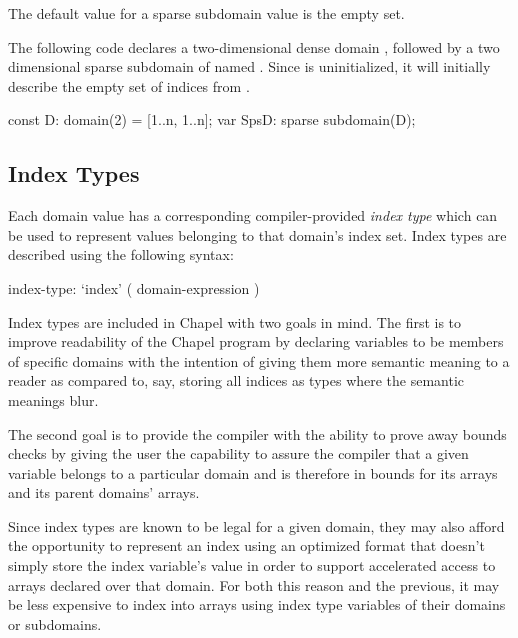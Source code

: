The default value for a sparse subdomain value is the empty set.

\begin{example}
The following code declares a two-dimensional dense domain ,
followed by a two dimensional sparse subdomain of 
named .  Since  is uninitialized, it will
initially describe the empty set of indices from .
\begin{chapel}
const D: domain(2) = [1..n, 1..n];
var SpsD: sparse subdomain(D);
\end{chapel}
\end{example}



\subsection{Index Types}
\label{Index_Types}

Each domain value has a corresponding compiler-provided \emph{index
type} which can be used to represent values belonging to that domain's
index set.  Index types are described using the following syntax:

\begin{syntax}
index-type:
  `index' ( domain-expression )
\end{syntax}

\begin{rationale}

Index types are included in Chapel with two goals in mind. The first
is to improve readability of the Chapel program by declaring variables
to be members of specific domains with the intention of giving them
more semantic meaning to a reader as compared to, say, storing all
indices as  types where the semantic meanings blur.

The second goal is to provide the compiler with the ability to prove
away bounds checks by giving the user the capability to assure the
compiler that a given variable belongs to a particular domain and is
therefore in bounds for its arrays and its parent domains' arrays.

Since index types are known to be legal for a given domain, they may
also afford the opportunity to represent an index using an optimized
format that doesn't simply store the index variable's value in order
to support accelerated access to arrays declared over that domain.
For both this reason and the previous, it may be less expensive to
index into arrays using index type variables of their domains or
subdomains.

\end{rationale}

